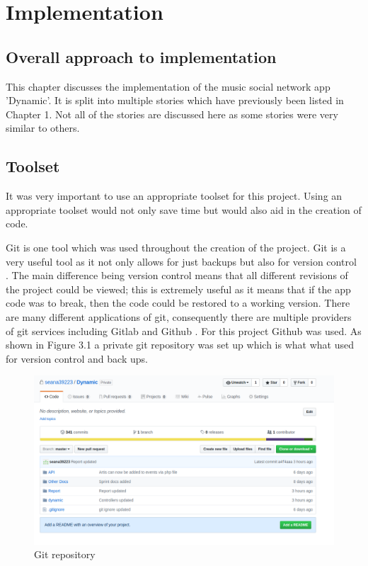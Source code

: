 \chapter{Implementation}
\section{Overall approach to implementation}
This chapter discusses the implementation of the music social network app 'Dynamic'. It is split into  multiple stories which have previously been listed in Chapter 1. Not all of the stories are discussed here as some stories were very similar to others.

\section{Toolset}
It was very important to use an appropriate toolset for this project. Using an appropriate toolset would not only save time but would also aid in the creation of code.

Git is one tool which was used throughout the creation of the project. Git is a very useful tool as it not only allows for just backups but also for version control \cite{git}. The main difference being version control means that all different revisions of the project could be viewed; this is extremely useful as it means that if the app code was to break, then the code could be restored to a working version. There are many different applications of git, consequently there are multiple providers of git services including Gitlab and Github \cite{github} \cite{gitlab}. For this project Github was used. As shown in Figure 3.1 a private git repository was set up which is what what used for version control and back ups.
\begin{center} 
\begin{figure}[H]
\includegraphics[scale=0.3]{images/git}
\caption{Git repository}
\end{figure}
\end{center}

